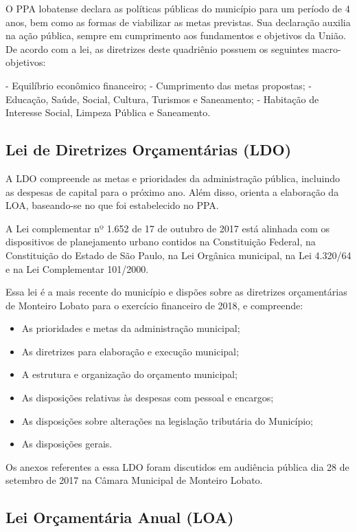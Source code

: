 	O PPA lobatense declara as políticas públicas do município para um período de 4 anos, bem como as formas de viabilizar as metas previstas. Sua declaração auxilia na ação pública, sempre em cumprimento aos fundamentos e objetivos da União. De acordo com a lei, as diretrizes deste quadriênio possuem os seguintes macro-objetivos:
	
	-	Equilíbrio econômico financeiro;
	-	Cumprimento das metas propostas;
	-	Educação, Saúde, Social, Cultura, Turismos e Saneamento;
	-	Habitação de Interesse Social, Limpeza Pública e Saneamento.
	
	\subsection{Lei de Diretrizes Orçamentárias (LDO)}
	
	A LDO compreende as metas e prioridades da administração pública, incluindo as despesas de capital para o próximo ano. Além disso, orienta a elaboração da LOA, baseando-se no que foi estabelecido no PPA.
	
	A Lei complementar nº 1.652 de 17 de outubro de 2017 está alinhada com os dispositivos de planejamento urbano contidos na Constituição Federal, na Constituição do Estado de São Paulo, na Lei Orgânica municipal, na Lei 4.320/64 e na Lei Complementar 101/2000.
	
	Essa lei é a mais recente do município e dispões sobre as diretrizes orçamentárias de Monteiro Lobato para o exercício financeiro de 2018, e compreende:
	
	\begin{itemize}
	\item As prioridades e metas da administração municipal;
	\item As diretrizes para elaboração e execução municipal;
	\item A estrutura e organização do orçamento municipal;
	\item As disposições relativas às despesas com pessoal e encargos;
	\item As disposições sobre alterações na legislação tributária do Município;
	\item As disposições gerais.
	\end{itemize}

	Os anexos referentes a essa LDO foram discutidos em audiência pública dia 28 de setembro de 2017 na Câmara Municipal de Monteiro Lobato.
	
	\subsection{Lei Orçamentária Anual (LOA)}
	
